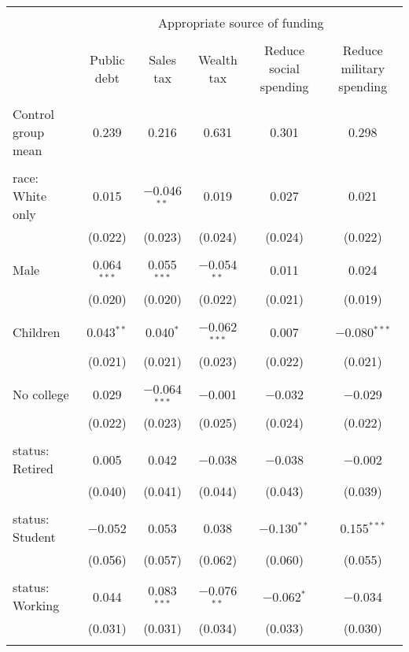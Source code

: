 
\begin{tabular}{@{\extracolsep{5pt}}lccccc} 
\\[-1.8ex]\hline 
\hline \\[-1.8ex] 
 & \multicolumn{5}{c}{Appropriate source of funding} \\ 
\cline{2-6} 
\\[-1.8ex] & Public debt & Sales tax & Wealth tax & Reduce social spending & Reduce military spending \\ 
\hline \\[-1.8ex] 
 Control group mean & 0.239 & 0.216 & 0.631 & 0.301 & 0.298  \\ \hline \\[-1.8ex] race: White only & 0.015 & $-$0.046$^{**}$ & 0.019 & 0.027 & 0.021 \\ 
  & (0.022) & (0.023) & (0.024) & (0.024) & (0.022) \\ 
  & & & & & \\ 
 Male & 0.064$^{***}$ & 0.055$^{***}$ & $-$0.054$^{**}$ & 0.011 & 0.024 \\ 
  & (0.020) & (0.020) & (0.022) & (0.021) & (0.019) \\ 
  & & & & & \\ 
 Children & 0.043$^{**}$ & 0.040$^{*}$ & $-$0.062$^{***}$ & 0.007 & $-$0.080$^{***}$ \\ 
  & (0.021) & (0.021) & (0.023) & (0.022) & (0.021) \\ 
  & & & & & \\ 
 No college & 0.029 & $-$0.064$^{***}$ & $-$0.001 & $-$0.032 & $-$0.029 \\ 
  & (0.022) & (0.023) & (0.025) & (0.024) & (0.022) \\ 
  & & & & & \\ 
 status: Retired & 0.005 & 0.042 & $-$0.038 & $-$0.038 & $-$0.002 \\ 
  & (0.040) & (0.041) & (0.044) & (0.043) & (0.039) \\ 
  & & & & & \\ 
 status: Student & $-$0.052 & 0.053 & 0.038 & $-$0.130$^{**}$ & 0.155$^{***}$ \\ 
  & (0.056) & (0.057) & (0.062) & (0.060) & (0.055) \\ 
  & & & & & \\ 
 status: Working & 0.044 & 0.083$^{***}$ & $-$0.076$^{**}$ & $-$0.062$^{*}$ & $-$0.034 \\ 
  & (0.031) & (0.031) & (0.034) & (0.033) & (0.030) \\ 
  & & & & & \\ 

\end{tabular}
